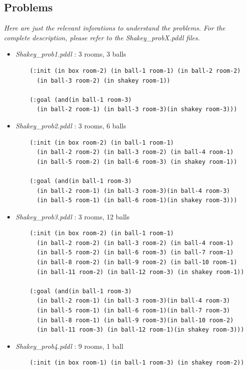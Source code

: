 \thispagestyle{empty}
\subsection*{Problems}

\textit{Here are just the relevant inforations to understand the problems.
For the complete description, please refer to the Shakey\_probX.pddl files.}
\begin{itemize}
  \item \textit{Shakey\_prob1.pddl} : 3 rooms, 3 balls
  \vspace*{1em}
  \begin{verbatim}
    (:init (in box room-2) (in ball-1 room-1) (in ball-2 room-2)
      (in ball-3 room-2) (in shakey room-1))

    (:goal (and(in ball-1 room-3)
      (in ball-2 room-1) (in ball-3 room-3)(in shakey room-3)))
  \end{verbatim}
  \item \textit{Shakey\_prob2.pddl} : 3 rooms, 6 balls
  \vspace*{1em}
  \begin{verbatim}
    (:init (in box room-2) (in ball-1 room-1)
      (in ball-2 room-2) (in ball-3 room-2) (in ball-4 room-1)
      (in ball-5 room-2) (in ball-6 room-3) (in shakey room-1))

    (:goal (and(in ball-1 room-3)
      (in ball-2 room-1) (in ball-3 room-3)(in ball-4 room-3)
      (in ball-5 room-1) (in ball-6 room-1)(in shakey room-3)))
  \end{verbatim}
  \item \textit{Shakey\_prob3.pddl} : 3 rooms, 12 balls
  \vspace*{1em}
  \begin{verbatim}
    (:init (in box room-2) (in ball-1 room-1)
      (in ball-2 room-2) (in ball-3 room-2) (in ball-4 room-1)
      (in ball-5 room-2) (in ball-6 room-3) (in ball-7 room-1)
      (in ball-8 room-2) (in ball-9 room-2) (in ball-10 room-1)
      (in ball-11 room-2) (in ball-12 room-3) (in shakey room-1))

    (:goal (and(in ball-1 room-3)
      (in ball-2 room-1) (in ball-3 room-3)(in ball-4 room-3)
      (in ball-5 room-1) (in ball-6 room-1)(in ball-7 room-3)
      (in ball-8 room-1) (in ball-9 room-3)(in ball-10 room-2)
      (in ball-11 room-3) (in ball-12 room-1)(in shakey room-3)))
  \end{verbatim}
  \item \textit{Shakey\_prob4.pddl} : 9 rooms, 1 ball
  \vspace*{1em}
  \begin{verbatim}
    (:init (in box room-1) (in ball-1 room-3) (in shakey room-2))


\end{verbatim}
\end{itemize}
